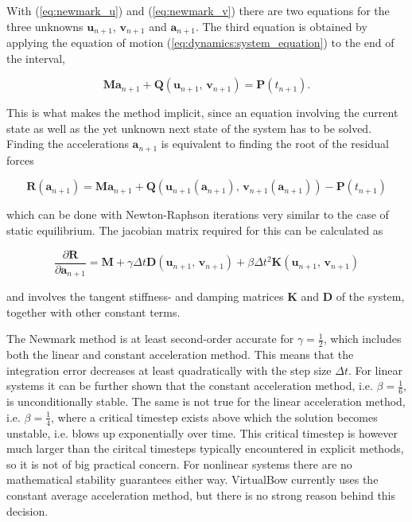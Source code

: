 With (\ref{eq:newmark_u}) and (\ref{eq:newmark_v}) there are two equations for the three unknowns $\boldsymbol{u}_{n+1}$, $\mathbf{v}_{n+1}$ and $\boldsymbol{a}_{n+1}$.
The third equation is obtained by applying the equation of motion (\ref{eq:dynamics:system_equation}) to the end of the interval,

\begin{equation}
\boldsymbol{M}\boldsymbol{a}_{n+1} + \boldsymbol{Q}(\boldsymbol{u}_{n+1},\,\mathbf{v}_{n+1}) = \boldsymbol{P}(t_{n+1}). \label{eq:newmark_balance}
\end{equation}

This is what makes the method implicit, since an equation involving the current state as well as the yet unknown next state of the system has to be solved.
Finding the accelerations $\boldsymbol{a}_{n+1}$ is equivalent to finding the root of the residual forces

\begin{equation}
\boldsymbol{R}(\boldsymbol{a}_{n+1}) = \boldsymbol{M}\boldsymbol{a}_{n+1} + \boldsymbol{Q}(\boldsymbol{u}_{n+1}(\boldsymbol{a}_{n+1}),\,\mathbf{v}_{n+1}(\boldsymbol{a}_{n+1})) - \boldsymbol{P}(t_{n+1}) \label{eq:newmark-residual}
\end{equation}

which can be done with Newton-Raphson iterations very similar to the case of static equilibrium.
The jacobian matrix required for this can be calculated as

\begin{equation}
\frac{\partial \boldsymbol{R}}{\partial \boldsymbol{a}_{n+1}} = \boldsymbol{M} + \gamma \Delta t \boldsymbol{D}(\boldsymbol{u}_{n+1},\,\mathbf{v}_{n+1}) + \beta \Delta t^2 \boldsymbol{K}(\boldsymbol{u}_{n+1},\,\mathbf{v}_{n+1})
\end{equation}

and involves the tangent stiffness- and damping matrices $\boldsymbol{K}$ and $\boldsymbol{D}$ of the system, together with other constant terms.

The Newmark method is at least second-order accurate for $\gamma = \frac{1}{2}$, which includes both the linear and constant acceleration method.
This means that the integration error decreases at least quadratically with the step size $\Delta t$.
For linear systems it can be further shown that the constant acceleration method, i.e. $\beta = \frac{1}{6}$, is unconditionally stable.
The same is not true for the linear acceleration method, i.e. $\beta = \frac{1}{4}$, where a critical timestep exists above which the solution becomes unstable, i.e. blows up exponentially over time.
This critical timestep is however much larger than the ciritcal timesteps typically encountered in explicit methods, so it is not of big practical concern.
For nonlinear systems there are no mathematical stability guarantees either way.
VirtualBow currently uses the constant average acceleration method, but there is no strong reason behind this decision.

